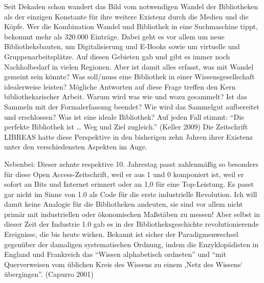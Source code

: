 \noindent Seit Dekaden schon wandert das Bild vom notwendigen Wandel der
Bibliotheken als der einzigen Konstante für ihre weitere Existenz durch
die Medien und die Köpfe. Wer die Kombination Wandel und Bibliothek in
eine Suchmaschine tippt, bekommt mehr als 320.000 Einträge. Dabei geht
es vor allem um neue Bibliotheksbauten, um Digitalisierung und E-Books
sowie um virtuelle und Gruppenarbeitsplätze. Auf diesen Gebieten gab und
gibt es immer noch Nachholbedarf in vielen Regionen. Aber ist damit
alles erfasst, was mit Wandel gemeint sein könnte? Was soll/muss eine
Bibliothek in einer Wissensgesellschaft idealerweise leisten? Mögliche
Antworten auf diese Frage treffen den Kern bibliothekarischer Arbeit.
Warum wird was wie und wozu gesammelt? Ist das Sammeln mit der
Formalerfassung beendet? Wie wird das Sammelgut aufbereitet und
erschlossen? Was ist eine ideale Bibliothek? Auf jeden Fall stimmt:
\enquote{Die perfekte Bibliothek ist \ldots{} Weg und Ziel zugleich.}
(Keller 2009) Die Zeitschrift LIBREAS hatte diese Perspektive in den
bisherigen zehn Jahren ihrer Existenz unter den verschiedensten Aspekten
im Auge.

Nebenbei: Dieser zehnte respektive 10. Jahrestag passt zahlenmäßig so
besonders für diese Open Access-Zeitschrift, weil er aus 1 und 0
komponiert ist, weil er sofort an Bits und Internet erinnert oder an 1,0
für eine Top-Leistung. Es passt gar nicht im Sinne von 1.0 als Code für
die erste industrielle Revolution. Ich will damit keine Analogie für die
Bibliotheken andeuten, sie sind vor allem nicht primär mit industriellen
oder ökonomischen Maßstäben zu messen! Aber selbst in dieser Zeit der
Industrie 1.0 gab es in der Bibliotheksgeschichte revolutionierende
Ereignisse, die bis heute wirken. Bekannt ist sicher der
Paradigmenwechsel gegenüber der damaligen systematischen Ordnung, indem
die Enzyklopädisten in England und Frankreich das \enquote{Wissen
alphabetisch ordneten} und \enquote{mit Querverweisen vom üblichen Kreis
des Wissens zu einem ‚Netz des Wissens` übergingen}. (Capurro 2001)

